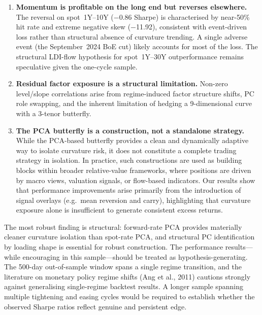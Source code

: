 \documentclass[11pt,a4paper]{article}
\begin{document}
\begin{enumerate}
  \item \textbf{Momentum is profitable on the long end but reverses
        elsewhere.}  The reversal on spot~1Y--10Y ($-$0.86 Sharpe) is
        characterised by near-50\% hit rate and extreme negative skew
        ($-$11.92), consistent with event-driven loss rather than
        structural absence of curvature trending.  A single adverse
        event (the September~2024 BoE cut) likely accounts for most of
        the loss.  The structural LDI-flow hypothesis for spot~1Y--30Y
        outperformance remains speculative given the one-cycle sample.

  \item \textbf{Residual factor exposure is a structural limitation.}
        Non-zero level/slope correlations arise from regime-induced
        factor structure shifts, PC role swapping, and the inherent
        limitation of hedging a 9-dimensional curve with a 3-tenor
        butterfly.

\item \textbf{The PCA butterfly is a construction, not a standalone strategy.}
      While the PCA-based butterfly provides a clean and dynamically
      adaptive way to isolate curvature risk, it does not constitute a
      complete trading strategy in isolation.  In practice, such
      constructions are used as building blocks within broader
      relative-value frameworks, where positions are driven by macro
      views, valuation signals, or flow-based indicators.  Our results
      show that performance improvements arise primarily from the
      introduction of signal overlays (e.g.\ mean reversion and carry),
      highlighting that curvature exposure alone is insufficient to
      generate consistent excess returns.
\end{enumerate}

The most robust finding is structural: forward-rate PCA provides materially
cleaner curvature isolation than spot-rate PCA, and structural PC
identification by loading shape is essential for robust construction.
The performance results---while encouraging in this sample---should be
treated as hypothesis-generating.  The 500-day out-of-sample window
spans a single regime transition, and the literature on monetary policy
regime shifts (Ang et al., 2011) cautions strongly against generalising
single-regime backtest results.  A longer sample spanning multiple
tightening and easing cycles would be required to establish whether the
observed Sharpe ratios reflect genuine and persistent edge.
\end{document}
